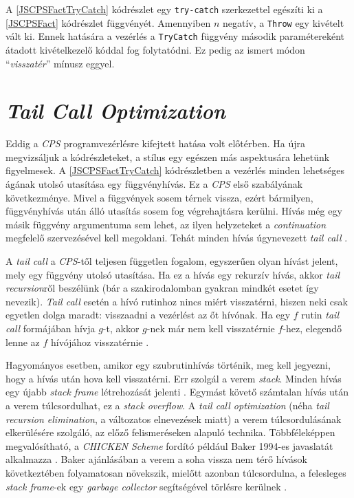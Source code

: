 A \ref{JSCPSFactTryCatch} kódrészlet egy \texttt{try-catch} szerkezettel egészíti ki a \ref{JSCPSFact} kódrészlet függvényét. Amennyiben $n$ negatív, a \texttt{Throw} egy kivételt vált ki. Ennek hatására a vezérlés a \texttt{TryCatch} függvény második paramétereként átadott kivételkezelő kóddal fog folytatódni. Ez pedig az ismert módon ``\textit{visszatér}'' mínusz eggyel.

\section{\textit{Tail Call Optimization}}

Eddig a \textit{CPS} programvezérlésre kifejtett hatása volt előtérben. Ha újra megvizsáljuk a kódrészleteket, a stílus egy egészen más aspektusára lehetünk figyelmesek. A \ref{JSCPSFactTryCatch} kódrészletben a vezérlés minden lehetséges ágának utolsó utasítása egy függvényhívás. Ez a \textit{CPS} első szabályának következménye. Mivel a függvények sosem térnek vissza, ezért bármilyen, függvényhívás után álló utasítás sosem fog végrehajtásra kerülni. Hívás még egy másik függvény argumentuma sem lehet, az ilyen helyzeteket a \textit{continuation} megfelelő szervezésével kell megoldani. Tehát minden hívás úgynevezett \textit{tail call} \cite{CompCont}.

A \textit{tail call} a \textit{CPS}-től teljesen független fogalom, egyszerűen olyan hívást jelent, mely egy függvény utolsó utasítása. Ha ez a hívás egy rekurzív hívás, akkor \textit{tail recursion}ről beszélünk (bár a szakirodalomban gyakran mindkét esetet így nevezik). \textit{Tail call} esetén a hívó rutinhoz nincs miért visszatérni, hiszen neki csak egyetlen dolga maradt: visszaadni a vezérlést az őt hívónak. Ha egy $f$ rutin \textit{tail call} formájában hívja $g$-t, akkor $g$-nek már nem kell visszatérnie $f$-hez, elegendő lenne az $f$ hívójához visszatérnie \cite{CompCont}. 

Hagyományos esetben, amikor egy szubrutinhívás történik, meg kell jegyezni, hogy a hívás után hova kell visszatérni. Err szolgál a verem \textit{stack}. Minden hívás egy újabb \textit{stack frame} létrehozását jelenti \cite{EssProgLan}. Egymást követő számtalan hívás után a verem túlcsordulhat, ez a \textit{stack overflow}. A \textit{tail call optimization} (néha \textit{tail recursion elimination}, a változatos elnevezések miatt) a verem túlcsordulásának elkerülésére szolgáló, az előző felismeréseken alapuló technika. Többféleképpen megvalósítható, a \textit{CHICKEN} \textit{Scheme} fordító például Baker 1994-es javaslatát alkalmazza \cite{ChickenCompilation}. Baker ajánlásában a verem a soha vissza nem térő hívások következtében folyamatosan növekszik, mielőtt azonban túlcsordulna, a felesleges \textit{stack frame}-ek egy \textit{garbage collector} segítségével törlésre kerülnek \cite{CheneyOnTheMTA}.
